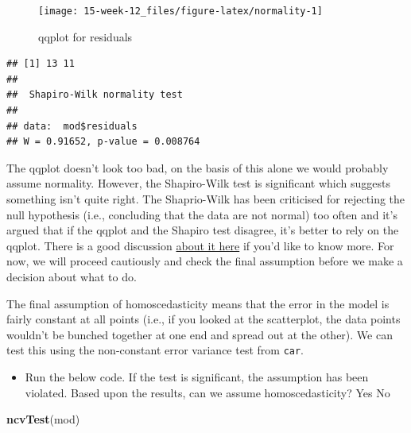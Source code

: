 \documentclass[]{book}
\newenvironment{Shaded}{\begin{snugshade}}{\end{snugshade}}
\newcommand{\KeywordTok}[1]{\textcolor[rgb]{0.13,0.29,0.53}{\textbf{#1}}}
\newcommand{\NormalTok}[1]{#1}
\newcommand{\OperatorTok}[1]{\textcolor[rgb]{0.81,0.36,0.00}{\textbf{#1}}}
\providecommand{\tightlist}{%
  \setlength{\itemsep}{0pt}\setlength{\parskip}{0pt}}
\begin{document}
\begin{figure}

{\centering \texttt{[image: 15-week-12\_files/figure-latex/normality-1]} 

}

\caption{qqplot for residuals}\label{fig:normality}
\end{figure}

\begin{Shaded}
\end{Shaded}

\begin{verbatim}
## [1] 13 11
## 
##  Shapiro-Wilk normality test
## 
## data:  mod$residuals
## W = 0.91652, p-value = 0.008764
\end{verbatim}

The qqplot doesn't look too bad, on the basis of this alone we would probably assume normality. However, the Shapiro-Wilk test is significant which suggests something isn't quite right. The Shaprio-Wilk has been criticised for rejecting the null hypothesis (i.e., concluding that the data are not normal) too often and it's argued that if the qqplot and the Shapiro test disagree, it's better to rely on the qqplot. There is a good discussion \href{https://stats.stackexchange.com/questions/2492/is-normality-testing-essentially-useless}{about it here} if you'd like to know more. For now, we will proceed cautiously and check the final assumption before we make a decision about what to do.

The final assumption of homoscedasticity means that the error in the model is fairly constant at all points (i.e., if you looked at the scatterplot, the data points wouldn't be bunched together at one end and spread out at the other). We can test this using the non-constant error variance test from \texttt{car}.

\begin{itemize}
\tightlist
\item
  Run the below code. If the test is significant, the assumption has been violated. Based upon the results, can we assume homoscedasticity? Yes No
\end{itemize}

\begin{Shaded}
\begin{Highlighting}[]
\KeywordTok{ncvTest}\NormalTok{(mod)}
\end{Highlighting}
\end{Shaded}
\end{document}
